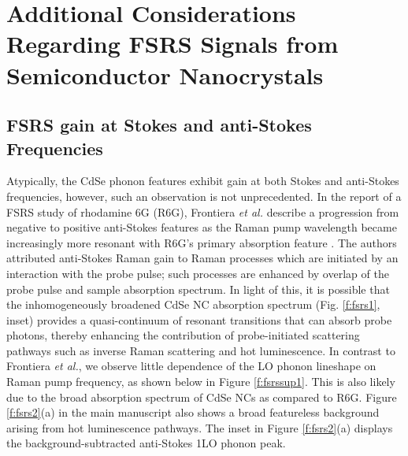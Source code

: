 \chapter{Additional Considerations Regarding FSRS Signals from Semiconductor Nanocrystals}    %

\section{FSRS gain at Stokes and anti-Stokes Frequencies}     %
Atypically, the CdSe phonon features exhibit gain at both Stokes and anti-Stokes frequencies, however, such an observation is not unprecedented. In the report of a FSRS study of rhodamine 6G (R6G), Frontiera \emph{et al.} describe a progression from negative to positive anti-Stokes features as the Raman pump wavelength became increasingly more resonant with R6G’s primary absorption feature \cite{DzhaganPhonon, frontiera2008origin}. The authors attributed anti-Stokes Raman gain to Raman processes which are initiated by an interaction with the probe pulse; such processes are enhanced by overlap of the probe pulse and sample absorption spectrum. In light of this, it is possible that the inhomogeneously broadened CdSe NC absorption spectrum (Fig. \ref{f:fsrs1}, inset) provides a quasi-continuum of resonant transitions that can absorb probe photons, thereby enhancing the contribution of probe-initiated scattering pathways such as inverse Raman scattering and hot luminescence. In contrast to Frontiera \emph{et al.}, we observe little dependence of the LO phonon lineshape on Raman pump frequency, as shown below in Figure \ref{f:fsrssup1}. This is also likely due to the broad absorption spectrum of CdSe NCs as compared to R6G. Figure \ref{f:fsrs2}(a) in the main manuscript also shows a broad featureless background arising from hot luminescence pathways. The inset in Figure \ref{f:fsrs2}(a) displays the background-subtracted anti-Stokes 1LO phonon peak. 


